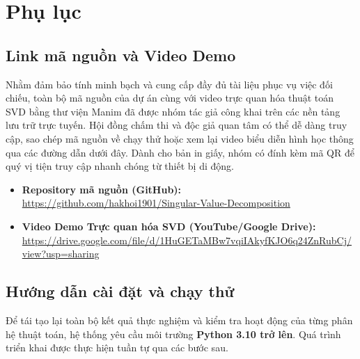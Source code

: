 \appendix
\section{Phụ lục}

\subsection{Link mã nguồn và Video Demo}

Nhằm đảm bảo tính minh bạch và cung cấp đầy đủ tài liệu phục vụ việc đối chiếu, toàn bộ mã nguồn của dự án cùng với video trực quan hóa thuật toán SVD bằng thư viện Manim đã được nhóm tác giả công khai trên các nền tảng lưu trữ trực tuyến. Hội đồng chấm thi và độc giả quan tâm có thể dễ dàng truy cập, sao chép mã nguồn về chạy thử hoặc xem lại video biểu diễn hình học thông qua các đường dẫn dưới đây. Dành cho bản in giấy, nhóm có đính kèm mã QR để quý vị tiện truy cập nhanh chóng từ thiết bị di động.

\begin{itemize}
    \item \textbf{Repository mã nguồn (GitHub):} \\
    \url{https://github.com/hakhoi1901/Singular-Value-Decomposition}
    \item \textbf{Video Demo Trực quan hóa SVD (YouTube/Google Drive):} \\
    \url{https://drive.google.com/file/d/1HuGETaMBw7vqiIAkyfKJO6q24ZnRubCj/view?usp=sharing}
\end{itemize}

\newpage

\subsection{Hướng dẫn cài đặt và chạy thử}

Để tái tạo lại toàn bộ kết quả thực nghiệm và kiểm tra hoạt động của từng phân hệ thuật toán, hệ thống yêu cầu môi trường \textbf{Python 3.10 trở lên}. Quá trình triển khai được thực hiện tuần tự qua các bước sau.

